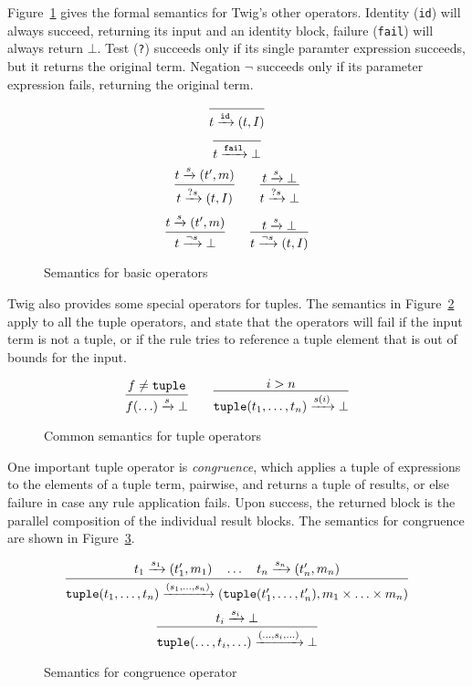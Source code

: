 Figure~\ref{fig:basic} gives the formal semantics for Twig's other operators. Identity (\texttt{id}) will always succeed, returning its input and an identity block, failure (\texttt{fail}) will always return \texttt{$\bot$}. Test (\texttt{?}) succeeds only if its single paramter expression succeeds, but it returns the original term. Negation \texttt{$\lnot$} succeeds only if its parameter expression fails, returning the original term.

\begin{figure}[ht]
\label{fig:basic}
\[
\infer
  {t \arr{\mathtt{id}} (t,I)}
  {}
\]
\[
\infer
  {t \arr{\mathtt{fail}} \bot}
  {}
\]
\[
\infer
  {t \arr{?s} (t,I)}
  {t \arr{s} (t',m)}
\qquad 
\infer
  {t \arr{?s} \bot}
  {t \arr{s} \bot}
\]
\[
\infer
  {t \arr{\lnot s} \bot}
  {t \arr{s} (t',m)}
\qquad 
\infer
  {t \arr{\lnot s} (t,I)}
  {t \arr{s} \bot}
\]
\caption{Semantics for basic operators}
\end{figure}

Twig also provides some special operators for tuples. The semantics in Figure~\ref{fig:all-tuples} apply to all the tuple operators, and state that the operators will fail if the input term is not a tuple, or if the rule tries to reference a tuple element that is out of bounds for the input.

\begin{figure}[ht]
\label{fig:all-tuples}
\[
\infer
  {f(\ldots) \arr{s} \bot}
  {f \neq \mathtt{tuple}}
\qquad
\infer
  {\mathtt{tuple}(t_1,\ldots,t_n) \arr{s(i)} \bot}
  {i > n}
\]
\caption{Common semantics for tuple operators}
\end{figure}

One important tuple operator is \emph{congruence}, which applies a tuple of expressions to the elements of a tuple term, pairwise, and returns a tuple of results, or else failure in case any rule application fails. Upon success, the returned block is the parallel composition of the individual result blocks. The semantics for congruence are shown in Figure~\ref{fig:congruence}.

\begin{figure}[ht]
\label{fig:congruence}
\[
\infer
  {\mathtt{tuple}(t_1,\ldots,t_n)\arr{(s_1,\ldots,s_n)} (\mathtt{tuple}(t_1',\ldots,t_n'),m_1 \times \ldots \times m_n) }
  {t_1 \arr{s_1} (t_1',m_1) \quad \ldots \quad t_n \arr{s_n} (t_n',m_n)}
\]
\[
\infer
  {\mathtt{tuple}(\ldots,t_i,\ldots)\arr{(\ldots,s_i,\ldots)}\bot}
  {t_i \arr{s_i} \bot}
\]
\caption{Semantics for congruence operator}
\end{figure}

